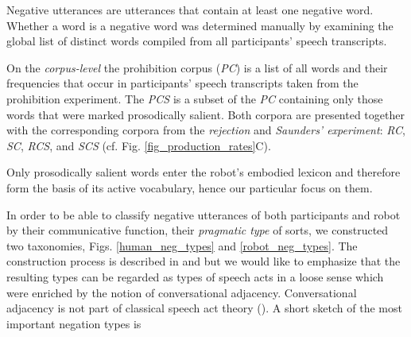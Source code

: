 Negative utterances are utterances that contain at least one negative word. Whether a word is a negative word was determined manually by examining the global
list of distinct words compiled from all participants' speech transcripts.

On the \emph{corpus-level} the prohibition corpus (\emph{PC}) is a list of all words and their frequencies that occur in participants' speech transcripts taken from the
prohibition experiment. The \emph{PCS} is a subset of the \emph{PC} containing only those words that were marked prosodically salient. Both corpora are presented
together with the corresponding corpora from the \emph{rejection} and \emph{Saunders' experiment}: \emph{RC}, \emph{SC}, \emph{RCS}, and \emph{SCS} (cf. Fig.
\ref{fig_production_rates}C).

Only prosodically salient words enter the robot's embodied lexicon and therefore form the basis of its active vocabulary, hence our particular focus on them.
\NewCoffin \HTaxonomy
\NewCoffin \HTaxonomyPtOne
\NewCoffin \HTaxonomyPtTwo
\SetHorizontalCoffin \HTaxonomy{}
\begin{figure*}[h]
\hspace*{-6ex}
  \SetHorizontalCoffin {}
  \JoinCoffins\HTaxonomy[vc,hc]\HTaxonomyPtOne[vc,hc]
\SetHorizontalCoffin {}
  \JoinCoffins{}\HTaxonomyPtTwo[t,l]
  \TypesetCoffin\HTaxonomy
  \caption{\textbf{Taxonomy of negation types used by participants}. Conv.: conversationally, 1st part-pair, 2nd part-pair: parts of an adjacency pair such as question 
    (1st part-pair) - answer (2nd part-pair)}
  \label{human_neg_types}
\end{figure*}
In order to be able to classify negative utterances of both participants and robot by their communicative function, their \emph{pragmatic type} of sorts, we
constructed two taxonomies, Figs. \ref{human_neg_types} and \ref{robot_neg_types}. The construction process is described in \cite{Foerster2017} and \cite{Foerster2013}
but we would like to emphasize that the resulting types can be regarded as types of speech acts in a loose sense which were enriched by the notion of
conversational adjacency. Conversational adjacency is not part of classical speech act theory (\cite{Austin1975,Searle1969}). A short sketch of the most important negation types is
